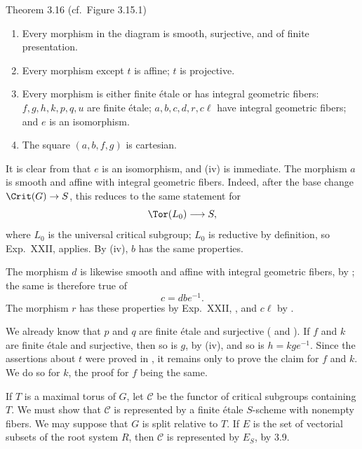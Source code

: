 \begin{sgastatement}{Theorem 3.16 \textup{(cf.\ Figure 3.15.1)}}
\begin{enumerate}[label=\textup{(\roman*)}]
\item Every morphism in the diagram is smooth, surjective, and of finite
presentation.
\item Every morphism except \(t\) is affine; \(t\) is projective.
\item Every morphism is either finite étale or has integral geometric
fibers: \(f,g,h,k,p,q,u\) are finite étale;
\(a,b,c,d,r,c\ell\) have integral geometric fibers; and \(e\) is an
isomorphism.
\item The square \((a,b,f,g)\) is cartesian.
\end{enumerate}
\end{sgastatement}

\SGAProof
It is clear from  that \(e\) is an isomorphism, and (iv) is
immediate.  The morphism \(a\) is smooth and affine with integral
geometric fibers.  Indeed, after the base change \(\Crit(G)\to S\), this
reduces to the same statement for
\[
 \Tor(L_0)\longrightarrow S,
\]
where \(L_0\) is the universal critical subgroup; \(L_0\) is reductive by
definition, so Exp.\ XXII,  applies.  By (iv), \(b\) has the same
properties.

The morphism \(d\) is likewise smooth and affine with integral geometric
fibers, by ; the same is therefore true of
\[
 c=dbe^{-1}.
\]
The morphism \(r\) has these properties by Exp.\ XXII, , and
\(c\ell\) by .

We already know that \(p\) and \(q\) are finite étale and surjective
( and ).  If \(f\) and \(k\) are finite étale and surjective, then
so is \(g\), by (iv), and so is \(h=kge^{-1}\).  Since the assertions
about \(t\) were proved in , it remains only to prove the claim for
\(f\) and \(k\).  We do so for \(k\), the proof for \(f\) being the same.

If \(T\) is a maximal torus of \(G\), let \(\mathcal C\) be the functor of
critical subgroups containing \(T\).  We must show that \(\mathcal C\) is
represented by a finite étale \(S\)-scheme with nonempty fibers.  We may
suppose that \(G\) is split relative to \(T\).  If \(E\) is the set of
vectorial subsets of the root system \(R\), then \(\mathcal C\) is
represented by \(E_S\), by 3.9.
\SGAQED

